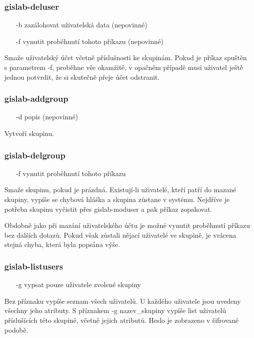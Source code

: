\subsubsection{gislab-deluser}
\begin{itemize}
\item [-b] zazálohovat uživatelská data (nepovinné)
\item [-f] vynutit proběhnutí tohoto příkazu (nepovinné)
\end{itemize}
Smaže uživatelský účet včetně příslušnosti ke skupinám. Pokud je
příkaz spuštěn s parametrem \textsf{-f}, proběhne vše okamžitě, v
opačném případě musí uživatel ještě jednou potvrdit, že si skutečně
přeje účet odstranit.

\subsubsection{gislab-addgroup}
\begin{itemize}
\item [-d] popis (nepovinné)
\end{itemize}
Vytvoří skupinu.

\subsubsection{gislab-delgroup}
\begin{itemize}
\item [-f] vynutit proběhnutí tohoto příkazu
\end{itemize}
Smaže skupinu, pokud je prázdná. Existují-li uživatelé, kteří patří do
mazané skupiny, vypíše se chybová hláška a skupina zůstane v
systému. Nejdříve je potřeba skupinu vyčistit přes
\textsf{gislab-moduser} a pak příkaz zopakovat.

Obdobně jako při mazání uživatelského účtu je možné vynutit proběhnutí
příkazu bez dalších dotazů. Pokud však zůstali nějací uživatelé ve
skupině, je vrácena stejná chyba, která byla popsána výše.

\subsubsection{gislab-listusers}
\begin{itemize}
\item [-g] vypsat pouze uživatele zvolené skupiny
\end{itemize}
Bez příznaku vypíše seznam všech uživatelů. U každého uživatele jsou
uvedeny všechny jeho atributy. S příznakem \textsf{-g nazev\_skupiny}
vypíše list uživatelů příslušících této skupině, včetně jejich
atributů. Heslo je zobrazeno v šifrované podobě.

